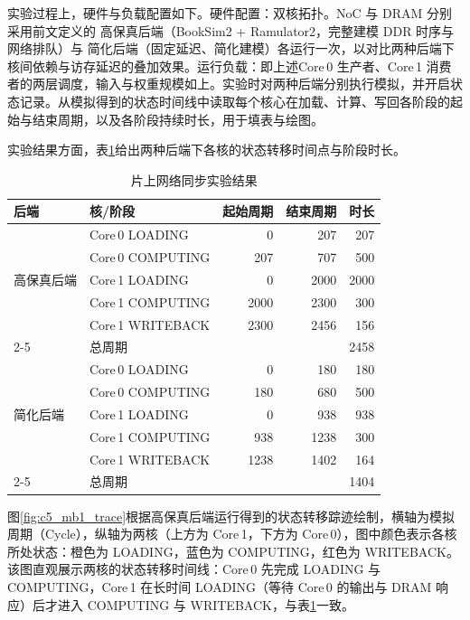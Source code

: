 实验过程上，硬件与负载配置如下。硬件配置：双核拓扑。NoC 与 DRAM 分别采用前文定义的 高保真后端（BookSim2 + Ramulator2，完整建模 DDR 时序与网络排队）与 简化后端（固定延迟、简化建模）各运行一次，以对比两种后端下核间依赖与访存延迟的叠加效果。运行负载：即上述Core\,0 生产者、Core\,1 消费者的两层调度，输入与权重规模如上。实验时对两种后端分别执行模拟，并开启状态记录。从模拟得到的状态时间线中读取每个核心在加载、计算、写回各阶段的起始与结束周期，以及各阶段持续时长，用于填表与绘图。

实验结果方面，表\ref{tab:mb1}给出两种后端下各核的状态转移时间点与阶段时长。

\begin{table}[H]
  \centering
  \caption{片上网络同步实验结果}
  \label{tab:mb1}
  \small
  \begin{tabular*}{\textwidth}{@{\extracolsep{\fill}}llrrr}
    \toprule
    后端 & 核/阶段 & 起始周期 & 结束周期 & 时长 \\
    \midrule
    \multirow{5}{*}{高保真后端} & Core\,0 LOADING  & 0    & 207  & 207 \\
                                    & Core\,0 COMPUTING & 207  & 707  & 500 \\
                                    & Core\,1 LOADING  & 0    & 2000 & 2000 \\
                                    & Core\,1 COMPUTING & 2000 & 2300 & 300 \\
                                    & Core\,1 WRITEBACK & 2300 & 2456 & 156 \\
    \cmidrule{2-5}
                                    & 总周期 & \multicolumn{3}{r}{2458} \\
    \midrule
    \multirow{5}{*}{简化后端} & Core\,0 LOADING  & 0   & 180 & 180 \\
                             & Core\,0 COMPUTING & 180 & 680 & 500 \\
                             & Core\,1 LOADING  & 0   & 938 & 938 \\
                             & Core\,1 COMPUTING & 938 & 1238 & 300 \\
                             & Core\,1 WRITEBACK & 1238 & 1402 & 164 \\
    \cmidrule{2-5}
                             & 总周期 & \multicolumn{3}{r}{1404} \\
    \bottomrule
  \end{tabular*}
\end{table}

图\ref{fig:c5_mb1_trace}根据高保真后端运行得到的状态转移踪迹绘制，横轴为模拟周期（Cycle），纵轴为两核（上方为 Core\,1，下方为 Core\,0），图中颜色表示各核所处状态：橙色为 LOADING，蓝色为 COMPUTING，红色为 WRITEBACK。该图直观展示两核的状态转移时间线：Core\,0 先完成 LOADING 与 COMPUTING，Core\,1 在长时间 LOADING（等待 Core\,0 的输出与 DRAM 响应）后才进入 COMPUTING 与 WRITEBACK，与表\ref{tab:mb1}一致。


